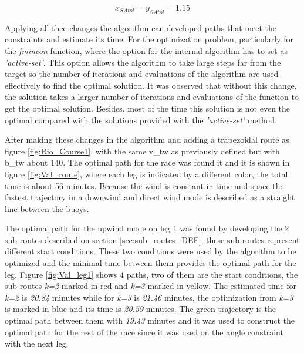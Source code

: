 \begin{equation} \label{eq:SailAreaTol}
    x_{SAtol}=y_{SAtol}=1.15
\end{equation}

Applying all thee changes the algorithm can developed paths that meet the constraints and estimate its time. For the optimization problem, particularly for the \textit{fmincon} function, where the option for the internal algorithm has to set as \textit{'active-set'}. This option allows the algorithm to take large steps far from the target so the number of iterations and evaluations of the algorithm are used effectively to find the optimal solution. It was observed that without this change, the solution takes a larger number of iterations and evaluations of the function to get the optimal solution. Besides, most of the time this solution is not even the optimal compared with the solutions provided with the \textit{'active-set'} method. \par 

After making these changes in the algorithm and adding a trapezoidal route as figure \ref{fig:Rio_Course1}, with the same \acrshort{v_tw} as previously defined but with \acrshort{b_tw} about 140\degree. The optimal path for the race was found it and it is shown in figure \ref{fig:Val_route}, where each leg is indicated by a different color, the total time is about 56 minutes. Because the wind is constant in time and space the fastest trajectory in a downwind and direct wind mode is described as a straight line between the buoys. \par \noindent 
The optimal path for the upwind mode on leg 1 was found by developing the 2 sub-routes described on section \ref{sec:sub_routes_DEF}, these sub-routes represent different start conditions. %
These two conditions were used by the algorithm to be optimized and the minimal time between them provides the optimal path for the leg. Figure \ref{fig:Val_leg1} shows 4 paths, two of them are the start conditions, the sub-routes \textit{k=2} marked in red and \textit{k=3} marked in yellow. The estimated time for \textit{k=2} is \textit{20.84} minutes while for \textit{k=3} is \textit{21.46} minutes, the optimization from \textit{k=3} is marked in blue and its time is \textit{20.59} minutes. The green trajectory is the optimal path between them with \textit{19.43} minutes and it was used to construct the optimal path for the rest of the race since it was used on the angle constraint with the next leg. \par 

